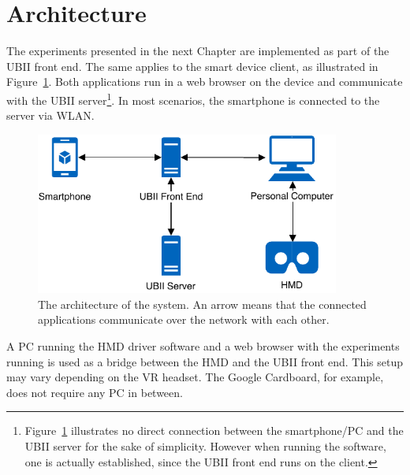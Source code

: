 \section{Architecture}\label{section:architecture}

The experiments presented in the next Chapter are implemented as part of the \ac{UBII} front end. The same applies to the smart device client, as illustrated in Figure~\ref{fig:architecture}. Both applications run in a web browser on the device and communicate with the \ac{UBII} server\footnote{Figure~\ref{fig:architecture} illustrates no direct connection between the smartphone/\ac{PC} and the \ac{UBII} server for the sake of simplicity. However when running the software, one is actually established, since the \ac{UBII} front end runs on the client.}. In most scenarios, the smartphone is connected to the server via \ac{WLAN}.

\begin{figure}[htpb]
  \centering
  \includegraphics[width=10cm]{figures/implementation/architecture.pdf}
  \caption[The architecture of the system.]{The architecture of the system. An arrow means that the connected applications communicate over the network with each other.}\label{fig:architecture}
\end{figure}

A \ac{PC} running the \ac{HMD} driver software and a web browser with the experiments running is used as a bridge between the \ac{HMD} and the \ac{UBII} front end. This setup may vary depending on the \ac{VR} headset. The Google Cardboard, for example, does not require any \ac{PC} in between.

